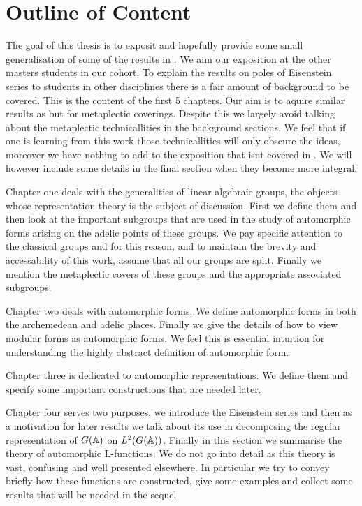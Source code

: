\section*{Outline of Content}
The goal of this thesis is to exposit and hopefully provide some small generalisation of some of the results in \cite{jiangPolesCertainResidual2013}. We aim our exposition at the other masters students in our cohort.
To explain the results on poles of Eisenstein series to students in other disciplines there is a fair amount of background to be covered. This is the content of the first 5 chapters. Our aim is to aquire similar results as \cite{jiangPolesCertainResidual2013} but for metaplectic coverings. Despite this we largely avoid talking about the metaplectic technicallities in the background sections. We feel that if one is learning from this work those technicallities will only obscure the ideas, moreover we have nothing to add to the exposition that isnt covered in \cite{moeglinSpectralDecompositionEisenstein1995}. We will however include some details in the final section when they become more integral. 

Chapter one deals with the generalities of linear algebraic groups, the objects whose representation theory is the subject of discussion. First we define them and then look at the important subgroups that are used in the study of automorphic forms arising on the adelic points of these groups. We pay specific attention to the classical groups and for this reason, and to maintain the brevity and accessability of this work, assume that all our groups are split. Finally we mention the metaplectic covers of these groups and the appropriate associated subgroups. 

Chapter two deals with automorphic forms. We define automorphic forms in both the archemedean and adelic places. Finally we give the details of how to view modular forms as automorphic forms. We feel this is essential intuition for understanding the highly abstract definition of automorphic form. 

Chapter three is dedicated to automorphic representations. We define them and specify some important constructions that are needed later. 

Chapter four serves two purposes, we introduce the Eisenstein series and then as a motivation for later results we talk about its use in decomposing the regular representation of \(G(\A)\) on \(L^2(G(\A))\). Finally in this section we summarise the theory of automorphic L-functions. We do not go into detail as this theory is vast, confusing and well presented elsewhere. In particular we try to convey briefly how these functions are constructed, give some examples and collect some results that will be needed in the sequel. 

